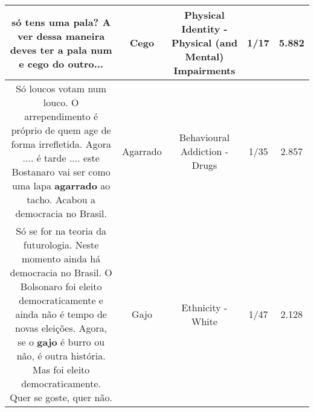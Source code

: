\documentclass[11pt]{article}
\newlength\mylength
\begin{document}
\begin{center}
\begin{longtable}{|C{.65\mylength}|C{.30\mylength}|C{.12\mylength}|C{.12\mylength}|C{.12\mylength}|}
  \small só tens uma pala? A ver dessa maneira deves ter a pala num e \textbf{cego} do outro...\normalsize   & Cego & Physical Identity - Physical (and Mental) Impairments & 1/17 & 5.882 \\  \hline
  \small Só loucos votam num louco. O arrependimento é próprio de quem age de forma irrefletida. Agora .... é tarde .... este Bostanaro vai ser como uma lapa \textbf{agarrado} ao tacho. Acabou a democracia no Brasil.\normalsize   & Agarrado & Behavioural Addiction - Drugs & 1/35 & 2.857 \\  \hline
  \small Só se for na teoria da futurologia. Neste momento ainda há democracia no Brasil. O Bolsonaro foi eleito democraticamente e ainda não é tempo de novas eleições. Agora, se o \textbf{gajo} é burro ou não, é outra história. Mas foi eleito democraticamente. Quer se goste, quer não.\normalsize   & Gajo & Ethnicity - White & 1/47 & 2.128 \\  \hline
  
\end{longtable}
\end{center}
\end{document}
